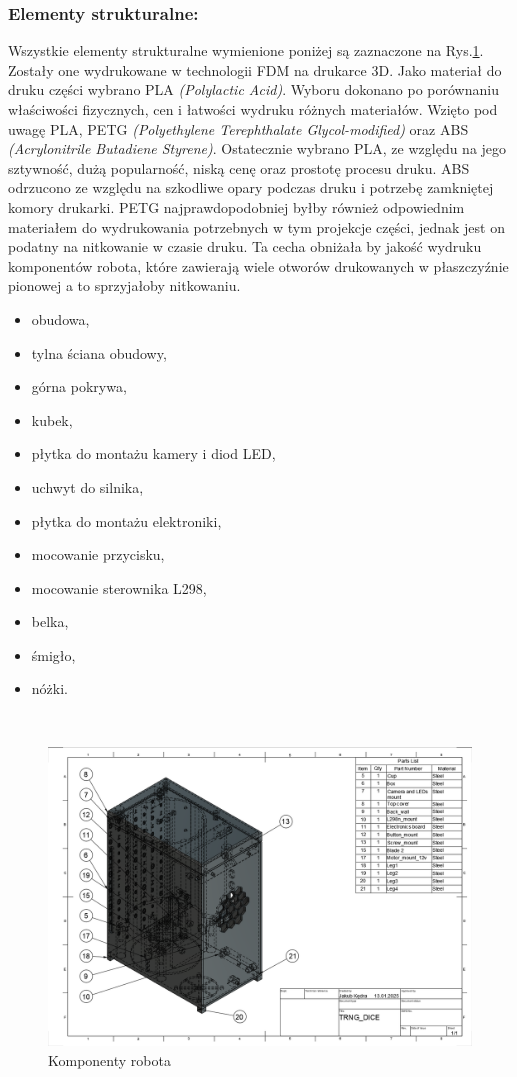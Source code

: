 \subsubsection{Elementy strukturalne:}
Wszystkie elementy strukturalne wymienione poniżej są zaznaczone na Rys.\ref{fig:komponenty}. Zostały one wydrukowane w technologii FDM na drukarce 3D. Jako materiał do druku części wybrano
PLA \textit{(Polylactic Acid)}. Wyboru dokonano po porównaniu właściwości fizycznych, cen i łatwości wydruku różnych materiałów. Wzięto pod uwagę
PLA, PETG \textit{(Polyethylene Terephthalate Glycol-modified)} oraz ABS \textit{(Acrylonitrile Butadiene Styrene)}. Ostatecznie wybrano PLA, ze względu na jego sztywność, dużą popularność,
niską cenę oraz prostotę procesu druku. ABS odrzucono ze względu na szkodliwe opary podczas druku i potrzebę zamkniętej komory drukarki. PETG najprawdopodobniej
byłby również odpowiednim materiałem do wydrukowania potrzebnych w tym projekcje części, jednak jest on podatny na nitkowanie w czasie druku. Ta cecha
obniżała by jakość wydruku komponentów robota, które zawierają wiele otworów drukowanych w płaszczyźnie pionowej a to sprzyjałoby nitkowaniu. \cite{PLA} \cite{PETG} \cite{ABS} \cite{PLA2}
    \begin{itemize}
        \item obudowa,
        \item tylna ściana obudowy,
        \item górna pokrywa,
        \item kubek,
        \item płytka do montażu kamery i diod LED,
        \item uchwyt do silnika,
        \item płytka do montażu elektroniki,
        \item mocowanie przycisku,
        \item mocowanie sterownika L298,
        \item belka,
        \item śmigło,
        \item nóżki.
    \end{itemize}\
    \begin{figure}[H]
        \centering
        \includegraphics[width=0.95\linewidth]{chapters/03-praca-wlasna/figures/komponenty.png}
        \caption{\label{fig:komponenty}Komponenty robota}
    \end{figure}

